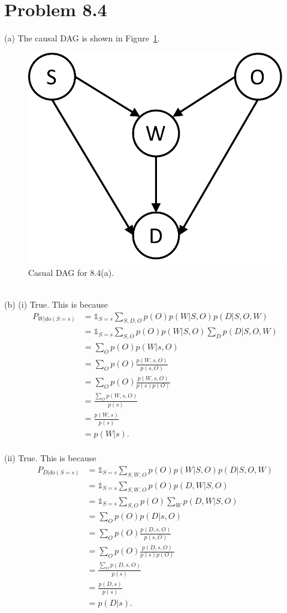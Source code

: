 \documentclass{article}
\newcommand{\qeds}{\hfill\qedsymbol}
\begin{document}
\section*{Problem 8.4}
(a) The causal DAG is shown in Figure~\ref{f:84a}.
%
\begin{figure}[h!]
  \centering
  \includegraphics[width=0.3\columnwidth]{84a.pdf}
    \vspace{-0.1cm}
  \caption{Casual DAG for 8.4(a).}
  \label{f:84a}
\end{figure}
\\

\noindent
(b) (i) True. This is because
\begin{align*}
	P_{W|do(S=s)} 
	&= \mathds{1}_{S=s} \sum_{S, D, O} p(O)p(W|S,O)p(D|S,O, W)\\
	&= \mathds{1}_{S=s} \sum_{S, O} p(O)p(W|S,O) \sum_D p(D|S,O, W) \\
	&= \sum_{O} p(O)p(W|s,O) \\
	&= \sum_{O} p(O)\frac{p(W, s, O)}{p(s, O)} \\
	&= \sum_{O} p(O)\frac{p(W, s, O)}{p(s)p(O)}\\
	&= \frac{\sum_{O}p(W, s, O)}{p(s)} \\
	&= \frac{p(W,s)}{p(s)}\\
	&=p(W|s).
\end{align*} \qeds
\\
%

\noindent
(ii) True. This is because
\begin{align*}
	P_{D|do(S=s)} 
	&= \mathds{1}_{S=s} \sum_{S, W, O} p(O)p(W|S,O)p(D|S,O, W)\\
	&= \mathds{1}_{S=s} \sum_{S, W, O} p(O)p(D, W|S,O)  \\
	&= \mathds{1}_{S=s} \sum_{S, O}p(O) \sum_W  p(D, W|S,O)  \\
	&= \sum_{O} p(O)p(D|s,O) \\
	&= \sum_{O} p(O)\frac{p(D, s, O)}{p(s, O)} \\
	&= \sum_{O} p(O)\frac{p(D, s, O)}{p(s)p(O)}\\
	&= \frac{\sum_{O}p(D, s, O)}{p(s)} \\
	&= \frac{p(D,s)}{p(s)}\\
	&=p(D|s).
\end{align*}\qeds
\\
%
\end{document}
